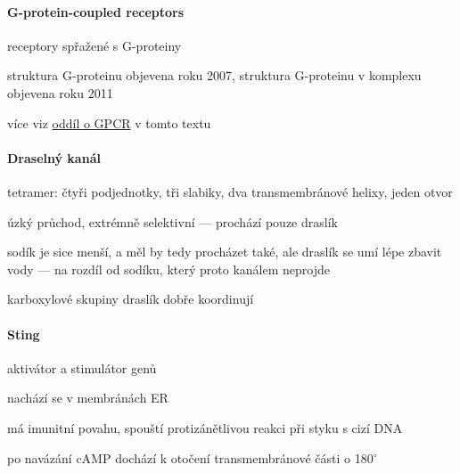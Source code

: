 \documentclass[DIV=8]{scrreprt}
\begin{document}
\paragraph{G-protein-coupled receptors}
\begin{myItemize}[nosep]
    \item receptory spřažené s G-proteiny
    \item struktura G-proteinu objevena roku 2007, struktura G-proteinu v komplexu objevena roku 2011
    \item více viz \hyperref[G-protein-coupled receptors]{oddíl o GPCR} v tomto textu
\end{myItemize}



\paragraph{Draselný kanál}
\begin{myItemize}[nosep]
    \item tetramer: čtyři podjednotky, tři slabiky, dva transmembránové helixy, jeden otvor
    \item úzký průchod, extrémně selektivní --- prochází pouze draslík
\begin{myItemize}[nosep]
    \item sodík je sice menší, a měl by tedy procházet také, ale draslík se umí lépe zbavit vody --- na rozdíl od sodíku, který proto kanálem neprojde
\end{myItemize}

    \item karboxylové skupiny draslík dobře koordinují
\end{myItemize}



\paragraph{Sting}
\begin{myItemize}[nosep]
    \item aktivátor a stimulátor genů
    \item nachází se v membránách ER
    \item má imunitní povahu, spouští protizánětlivou reakci při styku s cizí DNA
    \item po navázání cAMP dochází k otočení transmembránové části o 180\(^{\circ}\)
\end{myItemize}
\end{document}
